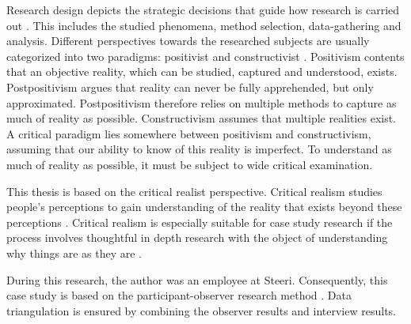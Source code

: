 \documentclass[english]{tktltiki2}
\theoremstyle{definition}
\theoremstyle{remark}
\begin{document}
Research design depicts the strategic decisions that guide how research is carried out \cite{denzin2000discipline}. This includes the studied phenomena, method selection, data-gathering and analysis. Different perspectives towards the researched subjects are usually categorized into two paradigms: positivist and constructivist \cite{gephart2004qualitative}. Positivism contents that an objective reality, which can be studied, captured and understood, exists. Postpositivism argues that reality can never be fully apprehended, but only approximated. Postpositivism therefore relies on multiple methods to capture as much of reality as possible. Constructivism assumes that multiple realities exist. A critical paradigm lies somewhere between positivism and constructivism, assuming that our ability to know of this reality is imperfect. To understand as much of reality as possible, it must be subject to wide critical examination. 

This thesis is based on the critical realist perspective. Critical realism studies people's perceptions to gain understanding of the reality that exists beyond these perceptions \cite{healy2000comprehensive}. Critical realism is especially suitable for case study research if the process involves thoughtful in depth research with the object of understanding why things are as they are \cite{easton2010critical}. 

During this research, the author was an employee at Steeri. Consequently, this case study is based on the participant-observer research method \cite{strauss1990basics}. Data triangulation is ensured by combining the observer results and interview results. 

\end{document}
